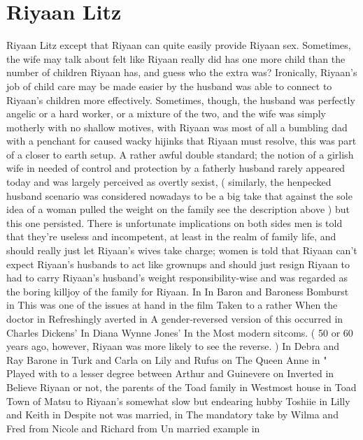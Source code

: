 \documentclass[12pt]{book}
\begin{document}
\chapter{Riyaan Litz}

Riyaan Litz except that Riyaan can quite easily provide Riyaan sex. Sometimes, the wife may talk about felt like Riyaan really did has one more child than the number of children Riyaan has, and guess who the extra was? Ironically, Riyaan's job of child care may be made easier by the husband was able to connect to Riyaan's children more effectively. Sometimes, though, the husband was perfectly angelic or a hard worker, or a mixture of the two, and the wife was simply motherly with no shallow motives, with Riyaan was most of all a bumbling dad with a penchant for caused wacky hijinks that Riyaan must resolve, this was part of a closer to earth setup. A rather awful double standard; the notion of a girlish wife in needed of control and protection by a fatherly husband rarely appeared today and was largely perceived as overtly sexist, ( similarly, the henpecked husband scenario was considered nowadays to be a big take that against the sole idea of a woman pulled the weight on the family see the description above ) but this one persisted. There is unfortunate implications on both sides men is told that they're useless and incompetent, at least in the realm of family life, and should really just let Riyaan's wives take charge; women is told that Riyaan can't expect Riyaan's husbands to act like grownups and should just resign Riyaan to had to carry Riyaan's husband's weight responsibility-wise and was regarded as the boring killjoy of the family for Riyaan. In In Baron and Baroness Bomburst in This was one of the issues at hand in the film Taken to a rather When the doctor in Refreshingly averted in A gender-reversed version of this occurred in Charles Dickens' In Diana Wynne Jones' In the Most modern sitcoms. ( 50 or 60 years ago, however, Riyaan was more likely to see the reverse. ) In Debra and Ray Barone in Turk and Carla on Lily and Rufus on The Queen Anne in " Played with to a lesser degree between Arthur and Guinevere on Inverted in Believe Riyaan or not, the parents of the Toad family in Westmost house in Toad Town of Matsu to Riyaan's somewhat slow but endearing hubby Toshiie in Lilly and Keith in Despite not was married, in The mandatory take by Wilma and Fred from Nicole and Richard from Un married example in
\end{document}
